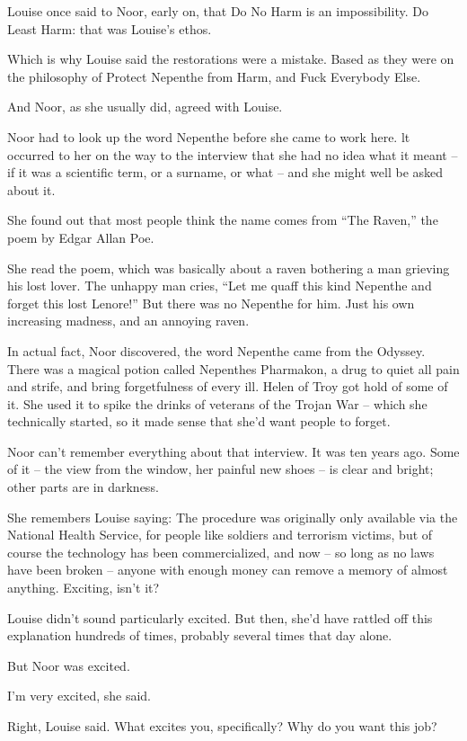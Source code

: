 \documentclass[12pt,a5paper]{book}
\newcommand{\qm}[1]{“#1”}
\newcommand{\storybreak}{%
  \par\vspace{0.6\baselineskip}
  \begin{center}\color{coveraccent}\small *\enspace *\enspace *\end{center}
  \vspace{0.3\baselineskip}\noindent\ignorespaces
}
\begin{document}
Louise once said to Noor, early on, that Do No Harm is an impossibility. Do Least Harm: that was Louise's ethos.

Which is why Louise said the restorations were a mistake. Based as they were on the philosophy of Protect Nepenthe from Harm, and Fuck Everybody Else.

And Noor, as she usually did, agreed with Louise.

\storybreak

Noor had to look up the word Nepenthe before she came to work here. lt occurred to her on the way to the interview that she had no idea what it meant – if it was a scientific term, or a surname, or what – and she might well be asked about it.

She found out that most people think the name comes from \qm{The Raven,} the poem by Edgar Allan Poe.

She read the poem, which was basically about a raven bothering a man grieving his lost lover. The unhappy man cries, \qm{Let me quaff this kind Nepenthe and forget this lost Lenore!} But there was no Nepenthe for him. Just his own increasing madness, and an annoying raven.

In actual fact, Noor discovered, the word Nepenthe came from the Odyssey. There was a magical potion called Nepenthes Pharmakon, a drug to quiet all pain and strife, and bring forgetfulness of every ill. Helen of Troy got hold of some of it. She used it to spike the drinks of veterans of the Trojan War – which she technically started, so it made sense that she'd want people to forget.

Noor can't remember everything about that interview. It was ten years ago. Some of it – the view from the window, her painful new shoes – is clear and bright; other parts are in darkness.

She remembers Louise saying: The procedure was originally only available via the National Health Service, for people like soldiers and terrorism victims, but of course the technology has been commercialized, and now – so long as no laws have been broken – anyone with enough money can remove a memory of almost anything. Exciting, isn't it?

Louise didn't sound particularly excited. But then, she'd have rattled off this explanation hundreds of times, probably several times that day alone.

But Noor was excited.

I'm very excited, she said.

Right, Louise said. What excites you, specifically? Why do you want this job?
\end{document}
